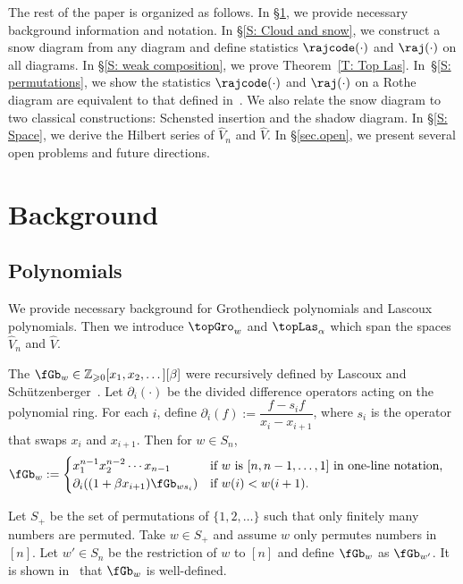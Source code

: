 The rest of the paper is organized as follows. 
In \S\ref{S: Background}, we provide necessary background information and notation.
In \S\ref{S: Cloud and snow}, we construct a snow diagram from any diagram 
and define statistics $\rajcode(\cdot)$ and $ \raj(\cdot)$ on all diagrams.
In \S\ref{S: weak composition}, we  prove Theorem~\ref{T: Top Las}.
In~\S\ref{S: permutations}, we show the statistics $\rajcode(\cdot)$ and $\raj(\cdot)$ 
on a Rothe diagram are equivalent to that defined in~\cite{PSW}.
We also relate the snow diagram to two classical constructions: 
Schensted insertion and the shadow diagram.
In \S\ref{S: Space}, we derive the Hilbert series 
of $\widehat{V}_n$ and $\widehat{V}$.
In \S\ref{sec.open}, we present several open problems and future directions.

\section{Background}
\label{S: Background}
\subsection{Polynomials}
We provide necessary background
for Grothendieck polynomials and Lascoux polynomials.
Then we introduce
$\topGro_w$ and $\topLas_\alpha$ 
which span the spaces $\widehat{V}_n$ and $\widehat{V}$. 

The  $\fGb_w \in 
\mathbb{Z}_{\geqslant 0}[x_1, x_2, \dots][\beta]$
were recursively defined by Lascoux and Sch{\"u}tzenberger~\cite{LS:Groth}. 
Let $\partial_i(\cdot)$ be the divided difference operators acting 
on the polynomial ring.
For each $i$,
define $\partial_i(f) := \dfrac{f - s_i f}{x_i-x_{i+1}}$,
where $s_i$ is the operator that swaps $x_i$ and $x_{i+1}$.
Then for $w\in S_n$, 
\begin{align*}
\fGb_w &:=
\begin{cases}
x_1^{n-1}x_2^{n-2}\cdots x_{n-1} &\text{if $w$ is $[n, n-1, \dots, 1]$ in one-line notation,} \\
\partial_i( (1 + \beta x_{i+1}) \fGb_{ws_i} ) &\text{if $w(i)<w(i+1)$.}
\end{cases}
\end{align*}

Let $S_+$ be the set of permutations
of $\{1, 2, \dots\}$
such that only finitely many numbers are permuted.
Take $w \in S_+$ and assume $w$ only permutes numbers in $[n]$.
Let $w' \in S_n$ be the restriction of $w$ to $[n]$
and define $\fGb_w$ as $\fGb_{w'}$.
It is shown in~\cite{LS:Groth} that $\fGb_w$ is well-defined.

